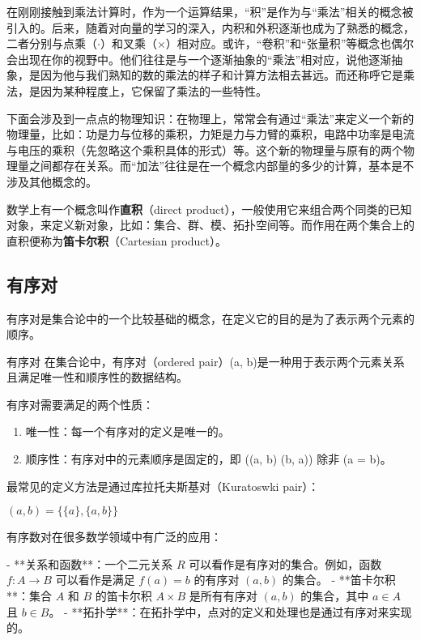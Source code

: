 
在刚刚接触到乘法计算时，作为一个运算结果，“积”是作为与“乘法”相关的概念被引入的。后来，随着对向量的学习的深入，内积和外积逐渐也成为了熟悉的概念，二者分别与点乘（$\cdot$）和叉乘（$\times$）相对应。或许，“卷积”和“张量积”等概念也偶尔会出现在你的视野中。他们往往是与一个逐渐抽象的“乘法”相对应，说他逐渐抽象，是因为他与我们熟知的数的乘法的样子和计算方法相去甚远。而还称呼它是乘法，是因为某种程度上，它保留了乘法的一些特性。

下面会涉及到一点点的物理知识：在物理上，常常会有通过“乘法”来定义一个新的物理量，比如：功是力与位移的乘积，力矩是力与力臂的乘积，电路中功率是电流与电压的乘积（先忽略这个乘积具体的形式）等。这个新的物理量与原有的两个物理量之间都存在关系。而“加法”往往是在一个概念内部量的多少的计算，基本是不涉及其他概念的。

数学上有一个概念叫作\textbf{直积}（direct product），一般使用它来组合两个同类的已知对象，来定义新对象，比如：集合、群、模、拓扑空间等。而作用在两个集合上的直积便称为\textbf{笛卡尔积}（Cartesian product）。

\subsection{有序对}

有序对是集合论中的一个比较基础的概念，在定义它的目的是为了表示两个元素的顺序。

\begin{definition}{有序对}
在集合论中，有序对（ordered pair）(a, b)是一种用于表示两个元素关系且满足唯一性和顺序性的数据结构。
\end{definition}

有序对需要满足的两个性质：
\begin{enumerate}
\item 唯一性：每一个有序对的定义是唯一的。
\item 顺序性：有序对中的元素顺序是固定的，即 ((a, b) \neq (b, a)) 除非 (a = b)。
\end{enumerate}

最常见的定义方法是通过库拉托夫斯基对（Kuratoswki pair）：

$(a, b) = \{\{a\}, \{a, b\}\}$





有序数对在很多数学领域中有广泛的应用：

- **关系和函数**：一个二元关系 \(R\) 可以看作是有序对的集合。例如，函数 \(f : A \to B\) 可以看作是满足 \(f(a) = b\) 的有序对 \((a, b)\) 的集合。
- **笛卡尔积**：集合 \(A\) 和 \(B\) 的笛卡尔积 \(A \times B\) 是所有有序对 \((a, b)\) 的集合，其中 \(a \in A\) 且 \(b \in B\)。
- **拓扑学**：在拓扑学中，点对的定义和处理也是通过有序对来实现的。

